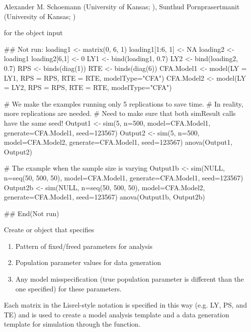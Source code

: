 \documentclass[a4paper]{book}
\begin{document}
%
\begin{Author}\relax
Alexander M. Schoemann (University of Kansas; ), 
Sunthud Pornprasertmanit (University of Kansas; )
\end{Author}
%
\begin{SeeAlso}\relax
{} for the object input
\end{SeeAlso}
%
\begin{Examples}
\begin{ExampleCode}
## Not run: 
loading1 <- matrix(0, 6, 1)
loading1[1:6, 1] <- NA
loading2 <- loading1
loading2[6,1] <- 0
LY1 <- bind(loading1, 0.7)
LY2 <- bind(loading2, 0.7)
RPS <- binds(diag(1))
RTE <- binds(diag(6))
CFA.Model1 <- model(LY = LY1, RPS = RPS, RTE = RTE, modelType="CFA")
CFA.Model2 <- model(LY = LY2, RPS = RPS, RTE = RTE, modelType="CFA")

# We make the examples running only 5 replications to save time.
# In reality, more replications are needed.
# Need to make sure that both simResult calls have the same seed!
Output1 <- sim(5, n=500, model=CFA.Model1, generate=CFA.Model1, seed=123567)
Output2 <- sim(5, n=500, model=CFA.Model2, generate=CFA.Model1, seed=123567)
anova(Output1, Output2)

# The example when the sample size is varying
Output1b <- sim(NULL, n=seq(50, 500, 50), model=CFA.Model1, generate=CFA.Model1, seed=123567)
Output2b <- sim(NULL, n=seq(50, 500, 50), model=CFA.Model2, generate=CFA.Model1, seed=123567)
anova(Output1b, Output2b)

## End(Not run)
\end{ExampleCode}
\end{Examples}
%
\begin{Description}\relax
Create  or  object that specifies
\begin{enumerate}

\item Pattern of fixed/freed parameters for analysis
\item Population parameter values for data generation
\item Any model misspecification (true population parameter is different than the one specified) for these parameters. 
\end{enumerate}

Each matrix in the Lisrel-style notation is specified in this way (e.g. LY, PS, and TE) and is used to create a model analysis template and a data generation template for simulation through the  function.
\end{Description}
\end{document}
